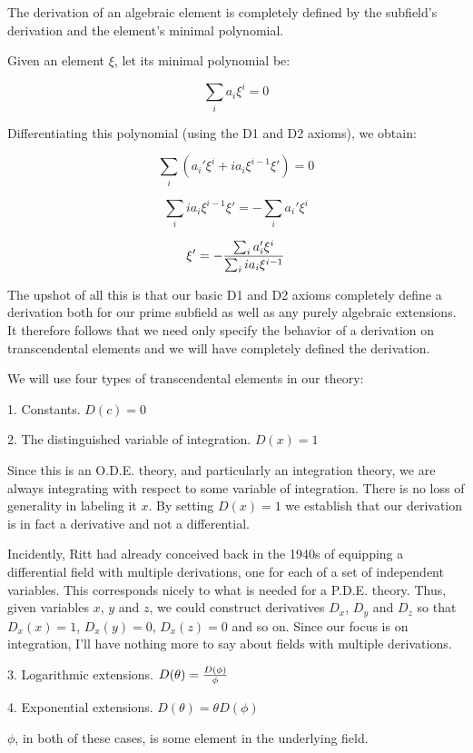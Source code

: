 \proof

The derivation of an algebraic element is completely
defined by the subfield's derivation and the element's minimal polynomial.

Given an element $\xi$, let its minimal polynomial be:

$$\sum_i a_i \xi^i = 0$$

Differentiating this polynomial (using the D1 and D2 axioms), we obtain:

$$\sum_i (a_i' \xi^i + i a_i \xi^{i-1} \xi') = 0 $$

$$\sum_i i a_i \xi^{i-1} \xi' = - \sum_i a_i' \xi^i $$

$$\xi' = - {\sum_i a_i' \xi^i \over {\sum_i i a_i \xi^{i-1}}} $$

\endtheorem

The upshot of all this is that our basic D1 and D2 axioms completely
define a derivation both for our prime subfield as well as any purely
algebraic extensions.  It therefore follows that we need only specify
the behavior of a derivation on transcendental elements and we will
have completely defined the derivation.

We will use four types of transcendental elements in our theory:

1. Constants.  $D(c)=0$

2. The distinguished variable of integration.  $D(x)=1$

Since this is an O.D.E. theory, and particularly an integration
theory, we are always integrating with respect to some variable of
integration.  There is no loss of generality in labeling it $x$.  By
setting $D(x)=1$ we establish that our derivation is in fact a
derivative and not a differential.

Incidently, Ritt had already conceived back in the 1940s of equipping
a differential field with multiple derivations, one for each of a set
of independent variables.  This corresponds nicely to what is
needed for a P.D.E. theory.  Thus, given variables $x$, $y$ and $z$,
we could construct derivatives $D_x$, $D_y$ and $D_z$ so that
$D_x(x)=1$, $D_x(y)=0$, $D_x(z)=0$ and so on.  Since our focus is
on integration, I'll have nothing more to say about fields with
multiple derivations.

3. Logarithmic extensions. $D(\theta)={D(\phi)\over{\phi}}$

4. Exponential extensions. $D(\theta)=\theta D(\phi)$

$\phi$, in both of these cases, is some element in the underlying field.

